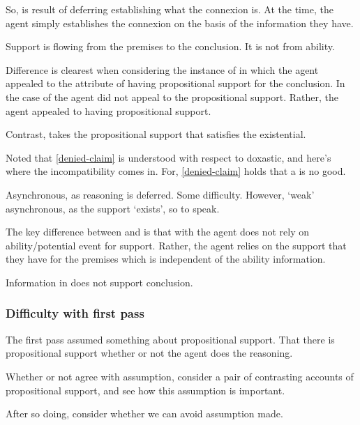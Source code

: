 \begin{note}[Deferring]
  So, \future{} is result of deferring establishing what the connexion is.
  At the time, the agent simply establishes the connexion on the basis of the information they have.
\end{note}

\begin{note}[Existential]
  Support is flowing from the premises to the conclusion.
  It is not from ability.

  Difference is clearest when considering the instance of \AR{} in which the agent appealed to the attribute of having propositional support for the conclusion.
  In the case of \AR{} the agent did not appeal to the propositional support.
  Rather, the agent appealed to having propositional support.

  Contrast, \WR{} takes the propositional support that satisfies the existential.
\end{note}

\begin{note}
  Noted that \ref{denied-claim} is understood with respect to doxastic, and here's where the incompatibility comes in.
  For, \ref{denied-claim} holds that a \future{} is no good.
\end{note}

\begin{note}[Asynchronous]
  Asynchronous, as reasoning is deferred.
  Some difficulty.
  However, `weak' asynchronous, as the support `exists', so to speak.
\end{note}

\begin{note}
  The key difference between \AR{} and \WR{} is that with \WR{} the agent does not rely on ability/potential event for support.
  Rather, the agent relies on the support that they have for the premises which is independent of the ability information.

  Information in \WR{} does not support conclusion.
\end{note}

\subsubsection{Difficulty with first pass}
\label{sec:diff-with-first}

\begin{note}[Overview]
  The first pass assumed something about propositional support.
  That there is propositional support whether or not the agent does the reasoning.

  Whether or not agree with assumption, consider a pair of contrasting accounts of propositional support, and see how this assumption is important.

  After so doing, consider whether we can avoid assumption made.
\end{note}

